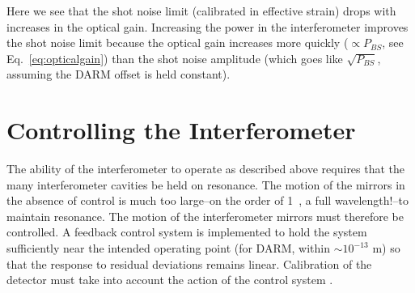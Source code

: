 Here we see that the shot noise limit (calibrated in effective strain)
drops with increases in the optical gain.  Increasing the power in the
interferometer improves the shot noise limit because the optical gain
increases more quickly ($\propto P_{BS}$, see
Eq.~\ref{eq:opticalgain}) than the shot noise amplitude (which goes
like $\sqrt{P_{BS}}$, assuming the DARM offset is held constant).








\section{Controlling the Interferometer}
The ability of the interferometer to operate as described above
requires that the many interferometer cavities be held on
resonance. The motion of the mirrors in the absence of control is much
too large--on the order of 1~\micron, a full wavelength!--to maintain
resonance. The motion of the interferometer mirrors must therefore be
controlled. A feedback control system is implemented to hold the
system sufficiently near the intended operating point (for DARM,
within $\sim 10^{-13}$ m) so that the response to residual deviations
remains linear. Calibration of the detector must take into account the
action of the control system \cite{KisselCalibrationPaper}. 

